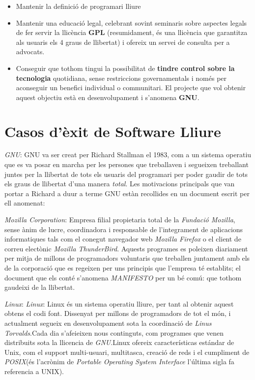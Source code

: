 	\begin{itemize}
	\item Mantenir la definició de programari lliure
	\item Mantenir una educació legal, celebrant sovint seminaris sobre aspectes legals de fer servir la 		llicència \textbf{GPL} (resumidament, és una llicència que garantitza als usuaris els 4 graus de 		llibertat) i ofereix un servei de consulta per a advocats.
	\item Conseguir que tothom tingui la possibilitat de \textbf{tindre control sobre la tecnologia} 		quotidiana, sense restriccions governamentals i només per aconseguir un benefici individual o 		communitari. El projecte que vol obtenir aquest objectiu està en desenvolupament i s'anomena 		\textbf{GNU}. \cite{ObjGNU} 
	\end{itemize}

\section{Casos d'èxit de Software Lliure}

\emph{GNU}: GNU va ser creat per Richard Stallman el 1983, com a un sistema operatiu que es va posar en marcha per les persones que treballaven i segueixen treballant juntes per la llibertat de tots els usuaris del programari per poder gaudir de tots els graus de llibertat d'una manera \textit{total}. Les motivacions principals que van portar a Richard a duur a terme GNU estàn recollides en un document escrit per ell anomenat:  \cite{GNUExit} \cite{GNUExitII} \cite{GNUMan}

\emph{Mozilla Corporation}: Empresa filial propietaria total de la \emph{Fundació Mozilla}, sense ànim de lucre, coordinadora i responsable de l'integrament de aplicacions informatiques tals com el conegut navegador web \textit{Mozilla Firefox} o el client de correu electònic \textit{Mozilla ThunderBird}. Aquests programes es poleixen diariament per mitja de millons de programadors voluntaris que treballen juntament amb els de la corporació que es regeixen per uns principis que l'empresa té establits; el document que els conté s'anomena \textit{MANIFESTO} per un bé comú: que tothom gaudeixi de la llibertat. \cite{MozExit} \cite{MozExitII} \cite{MozFesto}

\emph{Linux}: \emph{Linux}: Linux és un sistema operatiu lliure, per tant al obtenir aquest obtens el codi font. Dissenyat per millons de programadors de tot el món, i actualment segueix en desenvolupament sota la coordinació de \emph{Linus Torvalds}.Cada dia s'afeieixen nous continguts, com programes que venen distribuits sota la llicencia de \emph{GNU}.Linux ofereix características estándar de Unix, com el support multi-usuari, multitasca, creació de reds i el cumpliment de \emph{POSIX}(és l'acrònim de \emph{Portable Operating System Interface} l'última sigla fa referencia a UNIX). \cite{LinExit} \cite{POSIX}


